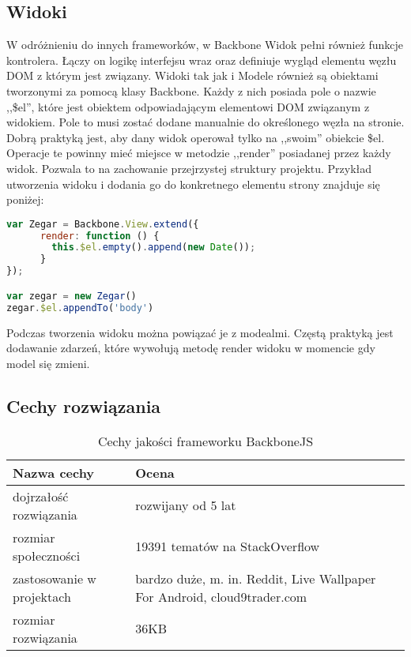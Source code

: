 \subsection{Widoki}
W odróżnieniu do innych frameworków, w Backbone Widok pełni również funkcje kontrolera. Łączy on logikę interfejsu wraz oraz definiuje wygląd elementu węzłu DOM z którym jest związany. Widoki tak jak i Modele również są obiektami tworzonymi za pomocą klasy Backbone. Każdy z nich posiada pole o nazwie ,,\$el'', które jest obiektem odpowiadającym elementowi DOM związanym z widokiem. Pole to musi zostać dodane manualnie do określonego węzła na stronie. Dobrą praktyką jest, aby dany widok operował tylko na ,,swoim'' obiekcie \$el. Operacje te powinny mieć miejsce w metodzie ,,render'' posiadanej przez każdy widok. Pozwala to na zachowanie przejrzystej struktury projektu. Przykład utworzenia widoku i dodania go do konkretnego elementu strony znajduje się poniżej:

\begin{lstlisting}[language=JavaScript]
var Zegar = Backbone.View.extend({ 
	  render: function () {
	  	this.$el.empty().append(new Date());
  	  }
});

var zegar = new Zegar()
zegar.$el.appendTo('body')
\end{lstlisting}

Podczas tworzenia widoku można powiązać je z modealmi. Częstą praktyką jest dodawanie zdarzeń, które wywołują metodę render widoku w momencie gdy model się zmieni.

\subsection{Cechy rozwiązania}
\begin{table}[h]
	\caption{Cechy jakości frameworku BackboneJS}
	\label{tab:heading-styles}
	\begin{tabularx}{\textwidth}{|X|X|}
		\hline
		Nazwa cechy							& Ocena 	\\ 
		\hline
		dojrzałość rozwiązania 				& rozwijany od 5 lat 	\\ 
		\hline
		rozmiar społeczności				& 19391 tematów na StackOverflow \\ 
		\hline
		zastosowanie w projektach			& bardzo duże, m. in. Reddit, Live Wallpaper 
		For Android, cloud9trader.com \\ 
		\hline
		rozmiar rozwiązania					& 36KB  \\
		\hline
	\end{tabularx}
\end{table}



